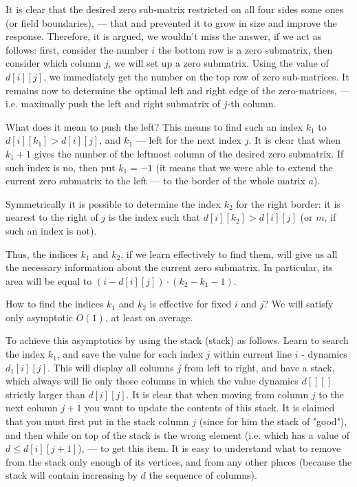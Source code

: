 It is clear that the desired zero sub-matrix restricted on all four sides some ones (or field boundaries), --- that and prevented it to grow in size and improve the response. Therefore, it is argued, we wouldn't miss the answer, if we act as follows: first, consider the number $i$ the bottom row is a zero submatrix, then consider which column $j$, we will set up a zero submatrix. Using the value of $d[i][j]$, we immediately get the number on the top row of zero sub-matrices. It remains now to determine the optimal left and right edge of the zero-matrices, --- i.e. maximally push the left and right submatrix of $j$-th column.

What does it mean to push the left? This means to find such an index $k_1$ to $d[i][k_1] > d[i][j]$, and $k_1$ --- left for the next index $j$. It is clear that when $k_1+1$ gives the number of the leftmost column of the desired zero submatrix. If such index is no, then put $k_1=-1$ (it means that we were able to extend the current zero submatrix to the left --- to the border of the whole matrix $a$).

Symmetrically it is possible to determine the index $k_2$ for the right border: it is nearest to the right of $j$ is the index such that $d[i][k_2] > d[i][j]$ (or $m$, if such an index is not).

Thus, the indices $k_1$ and $k_2$, if we learn effectively to find them, will give us all the necessary information about the current zero submatrix. In particular, its area will be equal to $(i - d[i][j]) \cdot (k_2 - k_1 - 1)$.

How to find the indices $k_1$ and $k_2$ is effective for fixed $i$ and $j$? We will satisfy only asymptotic $O(1)$, at least on average.

To achieve this asymptotics by using the stack (stack) as follows. Learn to search the index $k_1$, and save the value for each index $j$ within current line $i$ - dynamics $d_1[i][j]$. This will display all columns $j$ from left to right, and have a stack, which always will lie only those columns in which the value dynamics $d[][]$ strictly larger than $d[i][j]$. It is clear that when moving from column $j$ to the next column $j+1$ you want to update the contents of this stack. It is claimed that you must first put in the stack column $j$ (since for him the stack of "good"), and then while on top of the stack is the wrong element (i.e. which has a value of $d \le d[i][j+1]$), --- to get this item. It is easy to understand what to remove from the stack only enough of its vertices, and from any other places (because the stack will contain increasing by $d$ the sequence of columns).

